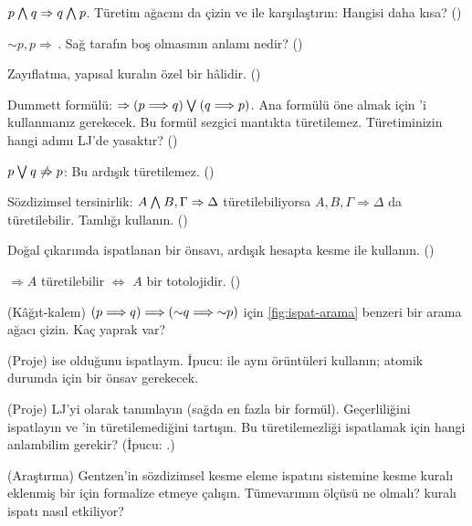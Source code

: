 \begin{alistirmalar}
 $p \mathbin{\textstyle\bigwedge} q \Rightarrow q \mathbin{\textstyle\bigwedge} p$. Türetim ağacını da çizin
ve  ile karşılaştırın: Hangisi daha kısa? ()

 ${\sim}p, p \Rightarrow$\,. Sağ tarafın boş olmasının
anlamı nedir? ()

 Zayıflatma, yapısal kuralın özel bir hâlidir.
()

 Dummett formülü: $\Rightarrow (p \Longrightarrow q) \mathbin{\textstyle\bigvee} (q \Longrightarrow
p)$. Ana formülü öne almak için 'i kullanmanız gerekecek. Bu
formül sezgici mantıkta türetilemez. Türetiminizin hangi adımı LJ'de
yasaktır? ()

 $p \mathbin{\textstyle\bigvee} q \not\Rightarrow p$: Bu ardışık türetilemez.
()

 Sözdizimsel tersinirlik: $A \mathbin{\textstyle\bigwedge} B, \Gamma \Rightarrow
\Delta$ türetilebiliyorsa $A, B, \Gamma \Rightarrow \Delta$ da
türetilebilir. Tamlığı kullanın. ()

 Doğal çıkarımda ispatlanan bir önsavı, ardışık hesapta
kesme ile kullanın. ()

 $\Rightarrow A$ türetilebilir $\iff$ $A$ bir totolojidir.
()

 (Kâğıt-kalem) $(p \Longrightarrow q) \Longrightarrow ({\sim}q \Longrightarrow {\sim}p)$
için \cref{fig:ispat-arama} benzeri bir arama ağacı çizin. Kaç yaprak
var?

 (Proje)  ise  olduğunu ispatlayın. İpucu: 
ile aynı örüntüleri kullanın; atomik durumda  için bir
önsav gerekecek.

 (Proje) LJ'yi  olarak tanımlayın (sağda en fazla bir formül). Geçerliliğini
ispatlayın ve 'in türetilemediğini
tartışın. Bu türetilemezliği ispatlamak için hangi anlambilim gerekir?
(İpucu: .)

 (Araştırma) Gentzen'in sözdizimsel kesme eleme ispatını
 sistemine kesme kuralı eklenmiş bir  için
formalize etmeye çalışın. Tümevarımın ölçüsü ne olmalı? 
kuralı ispatı nasıl etkiliyor?
\end{alistirmalar}
